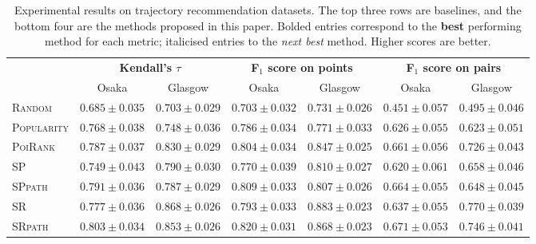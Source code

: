 
\begin{table*}[t]
\caption{Experimental results on trajectory recommendation datasets. The top three rows are baselines, and the bottom four are the methods proposed in this paper. Bolded entries correspond to the \textbf{best} performing method for each metric; italicised entries to the \textit{next best} method. 
Higher scores are better.}
\label{tab:result}
\centering
\small
\begin{tabular}{l|cc|cc|cc} \hline
                    & \multicolumn{2}{|c}{\textbf{Kendall's $\tau$}}
                    & \multicolumn{2}{|c}{\textbf{F$_1$ score on points}}
                    & \multicolumn{2}{|c}{\textbf{F$_1$ score on pairs}} \\ \cline{2-7}
                    & Osaka & Glasgow 
                    & Osaka & Glasgow  
                    & Osaka & Glasgow \\ \hline
\textsc{Random}     & $0.685\pm0.035$ & $0.703\pm0.029$
                    & $0.703\pm0.032$ & $0.731\pm0.026$
                    & $0.451\pm0.057$ & $0.495\pm0.046$ \\
\textsc{Popularity} & $0.768\pm0.038$ & $0.748\pm0.036$
                    & $0.786\pm0.034$ & $0.771\pm0.033$
                    & $0.626\pm0.055$ & $0.623\pm0.051$ \\
\textsc{PoiRank}    & $0.787\pm0.037$ & $0.830\pm0.029$
                    & $0.804\pm0.034$ & $0.847\pm0.025$
                    & $0.661\pm0.056$ & $0.726\pm0.043$ \\
\midrule
\textsc{SP}         & $0.749\pm0.043$ & $0.790\pm0.030$
                    & $0.770\pm0.039$ & $0.810\pm0.027$
                    & $0.620\pm0.061$ & $0.658\pm0.046$ \\
\textsc{SPpath}     & $\mathit{0.791\pm0.036}$ & $0.787\pm0.029$
                    & $\mathit{0.809\pm0.033}$ & $0.807\pm0.026$
                    & $\mathit{0.664\pm0.055}$ & $0.648\pm0.045$ \\
\textsc{SR}         & $0.777\pm0.036$ & $\mathbf{0.868\pm0.026}$
                    & $0.793\pm0.033$ & $\mathbf{0.883\pm0.023}$
                    & $0.637\pm0.055$ & $\mathbf{0.770\pm0.039}$ \\
\textsc{SRpath}     & $\mathbf{0.803\pm0.034}$ & $\mathit{0.853\pm0.026}$
                    & $\mathbf{0.820\pm0.031}$ & $\mathit{0.868\pm0.023}$
                    & $\mathbf{0.671\pm0.053}$ & $\mathit{0.746\pm0.041}$ \\ \hline
\end{tabular}
\end{table*}
